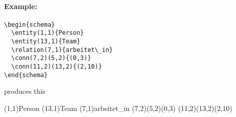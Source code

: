 \documentclass[a4paper,11pt]{article}
\begin{document}
\paragraph{Example:}

\begin{verbatim}
\begin{schema}
  \entity(1,1){Person}
  \entity(13,1){Team}
  \relation(7,1){arbeitet\_in}
  \conn(7,2)(5,2){(0,3)}
  \conn(11,2)(13,2){(2,10)}
\end{schema}
\end{verbatim}

produces this

\begin{schema}
  \entity(1,1){Person}
  \entity(13,1){Team}
  \relation(7,1){arbeitet\_in}
  \conn(7,2)(5,2){(0,3)}
  \conn(11,2)(13,2){(2,10)}
\end{schema}
\end{document}
